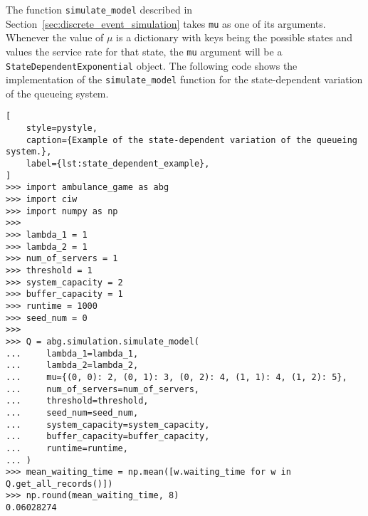 The function \texttt{simulate\_model} described in
Section~\ref{sec:discrete_event_simulation} takes \texttt{mu} as one of its
arguments.
Whenever the value of \(\mu\) is a dictionary with keys being the possible
states and values the service rate for that state, the \texttt{mu} argument
will be a \texttt{StateDependentExponential} object.
The following code shows the implementation of the
\texttt{simulate\_model} function for the state-dependent variation of the
queueing system.

\begin{lstlisting}[
    style=pystyle,
    caption={Example of the state-dependent variation of the queueing system.},
    label={lst:state_dependent_example},
]
>>> import ambulance_game as abg
>>> import ciw
>>> import numpy as np
>>>
>>> lambda_1 = 1
>>> lambda_2 = 1
>>> num_of_servers = 1
>>> threshold = 1
>>> system_capacity = 2
>>> buffer_capacity = 1
>>> runtime = 1000
>>> seed_num = 0
>>>
>>> Q = abg.simulation.simulate_model(
...     lambda_1=lambda_1,
...     lambda_2=lambda_2,
...     mu={(0, 0): 2, (0, 1): 3, (0, 2): 4, (1, 1): 4, (1, 2): 5},
...     num_of_servers=num_of_servers,
...     threshold=threshold,
...     seed_num=seed_num,
...     system_capacity=system_capacity,
...     buffer_capacity=buffer_capacity,
...     runtime=runtime,
... )
>>> mean_waiting_time = np.mean([w.waiting_time for w in Q.get_all_records()])
>>> np.round(mean_waiting_time, 8)
0.06028274

\end{lstlisting}
